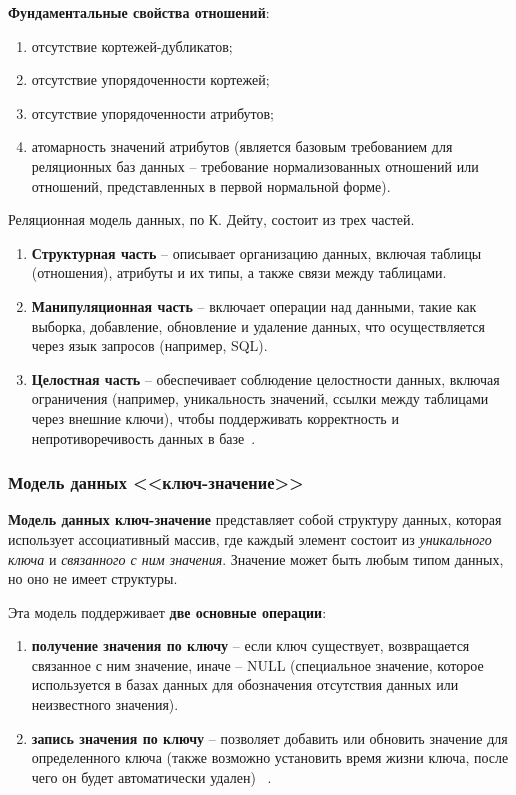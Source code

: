 \textbf{Фундаментальные свойства отношений}:
 \begin{enumerate}[label=---]
 	\item отсутствие кортежей-дубликатов;
 	\item отсутствие упорядоченности кортежей;
 	\item отсутствие упорядоченности атрибутов;
 	\item атомарность значений атрибутов (является базовым требованием для реляционных баз данных -- требование нормализованных отношений или отношений, представленных в первой нормальной форме).
 \end{enumerate}

Реляционная модель данных, по К. Дейту, состоит из трех частей.
 \begin{enumerate}[label=\arabic*.]
 		\item  \textbf{Структурная часть} -- описывает организацию данных, включая таблицы (отношения), атрибуты и их типы, а также связи между таблицами.
 		\item \textbf{Манипуляционная часть} -- включает операции над данными, такие как выборка, добавление, обновление и удаление данных, что осуществляется через язык запросов (например, SQL).
 		\item \textbf{Целостная часть} -- обеспечивает соблюдение целостности данных, включая ограничения (например, уникальность значений, ссылки между таблицами через внешние ключи), чтобы поддерживать корректность и непротиворечивость данных в базе~\cite[С. 30-35]{Avrunyev2018}.
 \end{enumerate}
 
 \subsubsection{Модель данных <<ключ-значение>>}
 
 \textbf{Модель данных ключ-значение} представляет собой структуру данных, которая использует ассоциативный массив, где каждый элемент состоит из \textit{уникального ключа} и \textit{связанного с ним значения}. Значение может быть любым типом данных, но оно не имеет структуры.
 
 Эта модель поддерживает \textbf{две основные операции}:
  \begin{enumerate}[label=---]
  	\item \textbf{получение значения по ключу} -- если ключ существует, возвращается связанное с ним значение, иначе -- NULL (специальное значение, которое используется в базах данных для обозначения отсутствия данных или неизвестного значения).
  	\item \textbf{запись значения по ключу} -- позволяет добавить или обновить значение для определенного ключа (также возможно установить время жизни ключа, после чего он будет автоматически удален) ~\cite[С. 89-91]{Avrunyev2018}.
  \end{enumerate}

